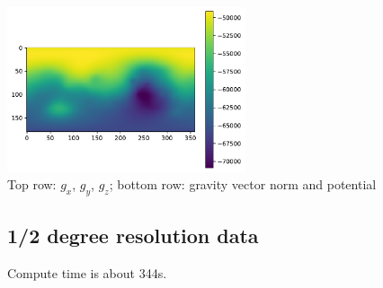 \begin{center}
\includegraphics[width=7cm]{python_codes/fieldstone_100/results/one/UU}\\
{\captionfont Top row: $g_x$, $g_y$, $g_z$;
bottom row: gravity vector norm and potential}
\end{center}

\subsection*{1/2 degree resolution data}

Compute time is about 344s. 

